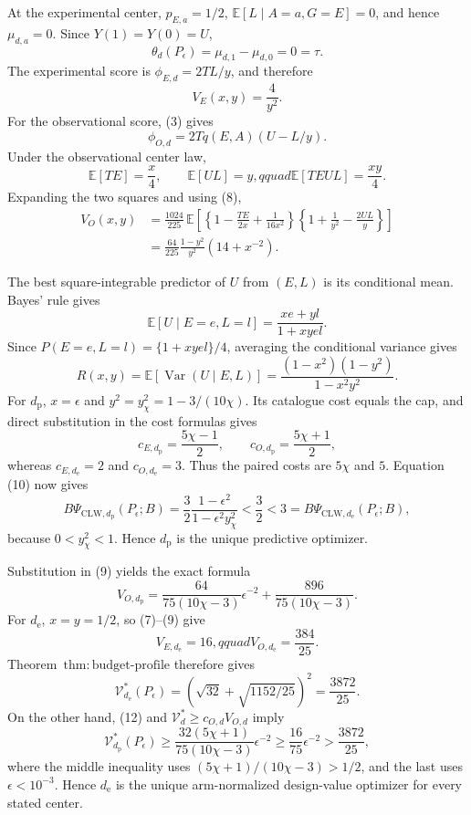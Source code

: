 At the experimental center, \(p_{E,a}=1/2\), \(\mathbb E[L\mid A=a,G=E]=0\), and hence \(\mu_{d,a}=0\).  Since \(Y(1)=Y(0)=U\),
\[
 \theta_d(P_\epsilon)=\mu_{d,1}-\mu_{d,0}=0
 =\tau.                                                \tag{6}
\]
The experimental score is \(\phi_{E,d}=2TL/y\), and therefore
\[
 V_E(x,y)=\frac{4}{y^2}.                               \tag{7}
\]
For the observational score, (3) gives
\[
 \phi_{O,d}=2Tq(E,A)(U-L/y).
\]
Under the observational center law,
\[
 \mathbb E[TE]=\frac{x}{4},\qquad
 \mathbb E[UL]=y,qquad
 \mathbb E[TEUL]=\frac{xy}{4}.                         \tag{8}
\]
Expanding the two squares and using (8),
\[
\begin{aligned}
 V_O(x,y)
 &=\frac{1024}{225}\,
 \mathbb E\!\left[
 \left\{1-\frac{TE}{2x}+\frac{1}{16x^2}\right\}
 \left\{1+\frac1{y^2}-\frac{2UL}{y}\right\}
 \right]\\
 &=\frac{64}{225}\frac{1-y^2}{y^2}\left(14+x^{-2}\right).       \tag{9}
\end{aligned}
\]

The best square-integrable predictor of \(U\) from \((E,L)\) is its conditional mean.  Bayes' rule gives
\[
 \mathbb E[U\mid E=e,L=l]=\frac{xe+yl}{1+xyel}.
\]
Since \(P(E=e,L=l)=\{1+xyel\}/4\), averaging the conditional variance gives
\[
 R(x,y)=\mathbb E[\operatorname{Var}(U\mid E,L)]
 =\frac{(1-x^2)(1-y^2)}{1-x^2y^2}.                    \tag{10}
\]
For \(d_{\mathrm p}\), \(x=\epsilon\) and
\(y^2=y_\chi^2=1-3/(10\chi)\).  Its catalogue cost equals the cap, and direct substitution in the cost formulas gives
\[
 c_{E,d_{\mathrm p}}=\frac{5\chi-1}{2},\qquad
 c_{O,d_{\mathrm p}}=\frac{5\chi+1}{2},
\]
whereas \(c_{E,d_{\mathrm e}}=2\) and \(c_{O,d_{\mathrm e}}=3\).  Thus the paired costs are \(5\chi\) and \(5\).  Equation (10) now gives
\[
 B\Psi_{\mathrm{CLW},d_{\mathrm p}}(P_\epsilon;B)
 =\frac32\frac{1-\epsilon^2}{1-\epsilon^2y_\chi^2}
 <\frac32<3
 =B\Psi_{\mathrm{CLW},d_{\mathrm e}}(P_\epsilon;B),             \tag{11}
\]
because \(0<y_\chi^2<1\).  Hence \(d_{\mathrm p}\) is the unique predictive optimizer.

Substitution in (9) yields the exact formula
\[
 V_{O,d_{\mathrm p}}
 =\frac{64}{75(10\chi-3)}\epsilon^{-2}
  +\frac{896}{75(10\chi-3)}.                         \tag{12}
\]
For \(d_{\mathrm e}\), \(x=y=1/2\), so (7)--(9) give
\[
 V_{E,d_{\mathrm e}}=16,qquad
 V_{O,d_{\mathrm e}}=\frac{384}{25}.
\]
Theorem~\(\mathrm{thm{:}budget\text{-}profile}\) therefore gives
\[
 \mathcal V_{d_{\mathrm e}}^*(P_\epsilon)
 =\left(\sqrt{32}+\sqrt{1152/25}\right)^2
 =\frac{3872}{25}.                                    \tag{13}
\]
On the other hand, (12) and \(\mathcal V_d^*\ge c_{O,d}V_{O,d}\) imply
\[
 \mathcal V_{d_{\mathrm p}}^*(P_\epsilon)
 \ge \frac{32(5\chi+1)}{75(10\chi-3)}\epsilon^{-2}
 \ge\frac{16}{75}\epsilon^{-2}
 >\frac{3872}{25},                                    \tag{14}
\]
where the middle inequality uses
\((5\chi+1)/(10\chi-3)>1/2\), and the last uses
\(\epsilon<10^{-3}\).  Hence \(d_{\mathrm e}\) is the unique arm-normalized design-value optimizer for every stated center.

